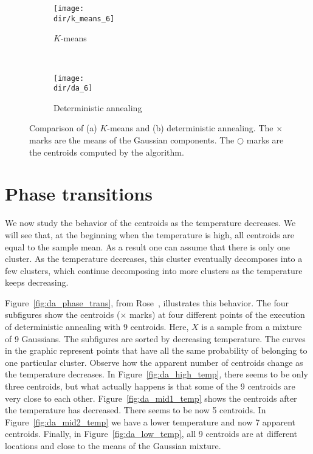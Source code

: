 \begin{figure}
    \centering
    \begin{subfigure}[b]{0.4\textwidth}
        \texttt{[image: \\dir/k\_means\_6]}
        \caption{$K$-means}
        \label{fig:k_means_6}
    \end{subfigure}
    ~ %
    \begin{subfigure}[b]{0.4\textwidth}
        \texttt{[image: \\dir/da\_6]}
        \caption{Deterministic annealing}
        \label{fig:da_6}
    \end{subfigure}
    \caption{Comparison of (a) $K$-means and (b) deterministic annealing. The $\times$ marks are the means of the Gaussian components. The $\bigcirc$ marks are the centroids computed by the algorithm.}
    \label{fig:da_vs_kmeans}
\end{figure}

\section{Phase transitions}
\label{sec:phase_transition}

We now study the behavior of the centroids as the temperature decreases.
We will see that, at the beginning when the temperature is high, all centroids
are equal to the sample mean. As a result one can assume that there
is only one cluster. As the temperature decreases, this cluster eventually decomposes into a few clusters, which continue decomposing into more clusters as the temperature keeps decreasing.

Figure~\ref{fig:da_phase_trans}, from Rose~\cite{rose1998deterministic}, illustrates this behavior. The four subfigures show the centroids ($\times$ marks) at four different points of the execution of
deterministic annealing with 9 centroids. Here, $X$ is a sample from a mixture of 9 Gaussians.
The subfigures are sorted by decreasing temperature. The curves in the graphic represent points that have all the same probability of belonging to one particular cluster. Observe how the apparent number of centroids change as the temperature
decreases. In Figure~\ref{fig:da_high_temp}, there seems to be only three centroids,
but what actually happens is that some of the 9 centroids are very close to
each other. Figure~\ref{fig:da_mid1_temp} shows the centroids after the temperature has decreased.
There seems to be now 5 centroids. In Figure~\ref{fig:da_mid2_temp} we have a lower
temperature and now 7 apparent centroids. Finally, in Figure~\ref{fig:da_low_temp}, all 9
centroids are at different locations and close to the means of the Gaussian
mixture.

